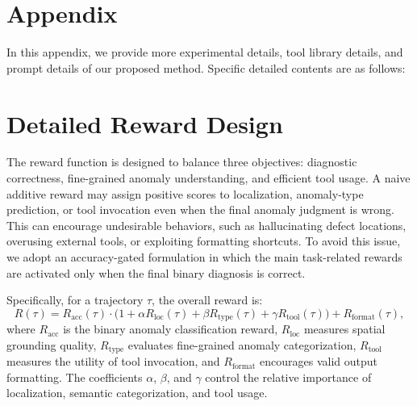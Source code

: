 \documentclass{llmxive}
\begin{document}


{
\small

 





\appendix
\section*{Appendix}

\label{app:discussion}
In this appendix, we provide more experimental details, tool library details, and prompt details of our proposed method.
Specific detailed contents are as follows:

\setlength{\cftbeforesecskip}{0.5em}
{
  \etocsettocstyle{}{}
  \localtableofcontents
}

\section{Detailed Reward Design}
\label{appx:reward_design}

The reward function is designed to balance three objectives: diagnostic correctness, fine-grained anomaly understanding, and efficient tool usage. 
A naive additive reward may assign positive scores to localization, anomaly-type prediction, or tool invocation even when the final anomaly judgment is wrong. 
This can encourage undesirable behaviors, such as hallucinating defect locations, overusing external tools, or exploiting formatting shortcuts. 
To avoid this issue, we adopt an accuracy-gated formulation in which the main task-related rewards are activated only when the final binary diagnosis is correct.

Specifically, for a trajectory $\tau$, the overall reward is:
\begin{equation}
R(\tau) =
R_{\text{acc}}(\tau)
\cdot
\Big(
1 + \alpha R_{\text{loc}}(\tau)
+ \beta R_{\text{type}}(\tau)
+ \gamma R_{\text{tool}}(\tau)
\Big)
+
R_{\text{format}}(\tau),
\end{equation}
where $R_{\text{acc}}$ is the binary anomaly classification reward, $R_{\text{loc}}$ measures spatial grounding quality, $R_{\text{type}}$ evaluates fine-grained anomaly categorization, $R_{\text{tool}}$ measures the utility of tool invocation, and $R_{\text{format}}$ encourages valid output formatting. 
The coefficients $\alpha$, $\beta$, and $\gamma$ control the relative importance of localization, semantic categorization, and tool usage.

}
\end{document}
